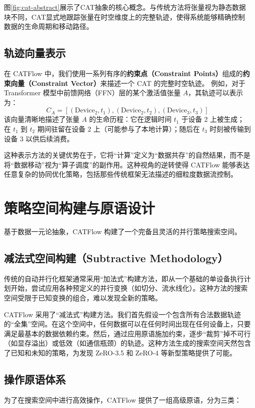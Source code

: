 图\ref{fig:cat-abstract}展示了CAT抽象的核心概念。与传统方法将张量视为静态数据块不同，CAT显式地跟踪张量在时空维度上的完整轨迹，使得系统能够精确控制数据的生命周期和移动路径。

\subsection{轨迹向量表示}
在 CATFlow 中，我们使用一系列有序的\textbf{约束点（Constraint Points）}组成的\textbf{约束向量（Constraint Vector）}来描述一个 CAT 的完整时空轨迹。
例如，对于 Transformer 模型中前馈网络（FFN）层的某个激活值张量 $A$，其轨迹可以表示为：
\begin{equation}
    C_{A} = [(\text{Device}_2, t_1), (\text{Device}_2, t_2), (\text{Device}_3, t_3)]
\end{equation}
该向量清晰地描述了张量 $A$ 的生命历程：它在逻辑时间 $t_1$ 于设备 2 上被生成；在 $t_1$ 到 $t_2$ 期间驻留在设备 2 上（可能参与了本地计算）；随后在 $t_3$ 时刻被传输到设备 3 以供后续消费。

这种表示方法的关键优势在于，它将“计算”定义为“数据共存”的自然结果，而不是将“数据移动”视为“算子调度”的副作用。这种视角的逆转使得 CATFlow 能够表达任意复杂的协同优化策略，包括那些传统框架无法描述的细粒度数据流控制。

\section{策略空间构建与原语设计}

基于数据一元论抽象，CATFlow 构建了一个完备且灵活的并行策略搜索空间。

\subsection{减法式空间构建（Subtractive Methodology）}
传统的自动并行化框架通常采用“加法式”构建方法，即从一个基础的单设备执行计划开始，尝试应用各种预定义的并行变换（如切分、流水线化）。这种方法的搜索空间受限于已知变换的组合，难以发现全新的策略。

CATFlow 采用了“减法式”构建方法。我们首先假设一个包含所有合法数据轨迹的“全集”空间。在这个空间中，任何数据可以在任何时间出现在任何设备上，只要满足最基本的数据依赖约束。然后，通过应用原语施加约束，逐步“裁剪”掉不可行（如显存溢出）或低效（如通信瓶颈）的轨迹。这种方法生成的搜索空间天然包含了已知和未知的策略，为发现 ZeRO-3.5 和 ZeRO-4 等新型策略提供了可能。

\subsection{操作原语体系}
为了在搜索空间中进行高效操作，CATFlow 提供了一组高级原语，分为三类：

